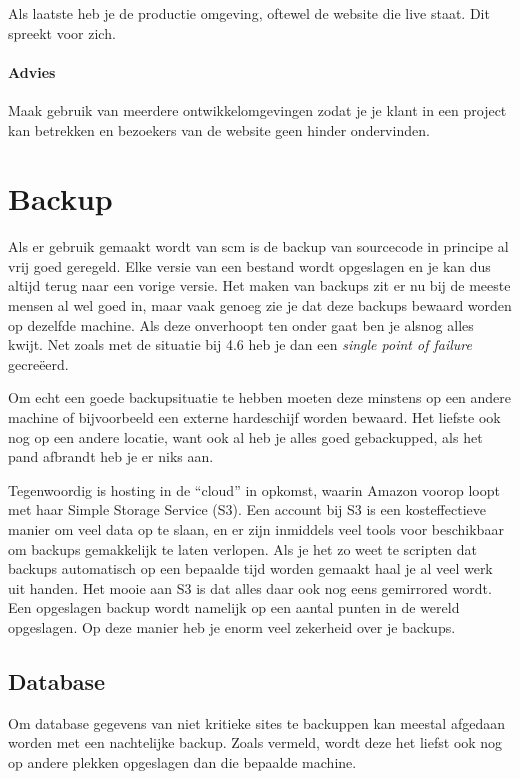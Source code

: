 Als laatste heb je de productie omgeving, oftewel de website die live staat. Dit spreekt voor zich.

\paragraph{Advies} Maak gebruik van meerdere ontwikkelomgevingen zodat je je klant in een project kan betrekken en bezoekers van de website geen hinder ondervinden.

\section{Backup}



Als er gebruik gemaakt wordt van {\sc scm} is de backup van sourcecode in principe al vrij goed geregeld. Elke versie van een bestand wordt opgeslagen en je kan dus altijd terug naar een vorige versie. Het maken van backups zit er nu bij de meeste mensen al wel goed in, maar vaak genoeg zie je dat deze backups bewaard worden op dezelfde machine. Als deze onverhoopt ten onder gaat ben je alsnog alles kwijt. Net zoals met de situatie bij 4.6 heb je dan een \emph{single point of failure} gecreëerd.

Om echt een goede backupsituatie te hebben moeten deze minstens op een andere machine of bijvoorbeeld een externe hardeschijf worden bewaard. Het liefste ook nog op een andere locatie, want ook al heb je alles goed gebackupped, als het pand afbrandt heb je er niks aan.

Tegenwoordig is hosting in de ``cloud'' in opkomst, waarin Amazon voorop loopt met haar Simple Storage Service (S3). Een account bij S3 is een kosteffectieve manier om veel data op te slaan, en er zijn inmiddels veel tools voor beschikbaar om backups gemakkelijk te laten verlopen. Als je het zo weet te scripten dat backups automatisch op een bepaalde tijd worden gemaakt haal je al veel werk uit handen. Het mooie aan S3 is dat alles daar ook nog eens gemirrored wordt. Een opgeslagen backup wordt namelijk op een aantal punten in de wereld opgeslagen. Op deze manier heb je enorm veel zekerheid over je backups.

\subsection{Database}

Om database gegevens van niet kritieke sites te backuppen kan meestal afgedaan worden met een nachtelijke backup. Zoals vermeld, wordt deze het liefst ook nog op andere plekken opgeslagen dan die bepaalde machine. 

